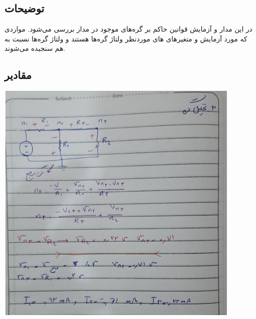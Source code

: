 \documentclass{article}
\begin{document}
		\subsection{توضیحات}
			در این مدار و آزمایش قوانین حاکم بر گره‌های موجود در مدار بررسی می‌شود. مواردی که مورد آزمایش و متغیر‌های های موردنظر ولتاژ گره‌ها هستند و ولتاژ گره‌ها نسبت به هم سنجیده می‌شوند.			
			\subsection{مقادیر}
				\begin{center}
					\includegraphics[width=12cm, height=12cm]{./images/2.}
				\end{center}
\end{document}
